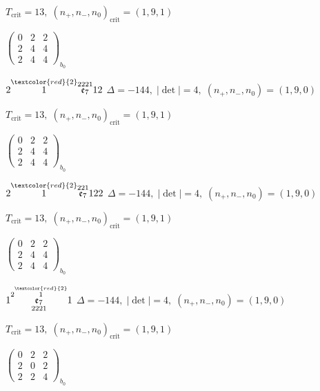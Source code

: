 \documentclass[10pt]{article}
\begin{document}
\hspace{1em}$T_{\text{crit}}=13,\; (n_+,n_-,n_0)_{\text{crit}}=(1,9,1)$

\hspace{2em}$\left(\begin{smallmatrix}0 & 2 & 2 \\ 2 & 4 & 4 \\ 2 & 4 & 4\end{smallmatrix}\right)_{\!b_0}$

\smallskip

$2\overset{\textcolor{red}{2}}{1}\overset{2221}{\mathfrak{e}_7}12$ \quad $\Delta=-144,\; |\det|=4,\; (n_+,n_-,n_0)=(1,9,0)$

\hspace{1em}$T_{\text{crit}}=13,\; (n_+,n_-,n_0)_{\text{crit}}=(1,9,1)$

\hspace{2em}$\left(\begin{smallmatrix}0 & 2 & 2 \\ 2 & 4 & 4 \\ 2 & 4 & 4\end{smallmatrix}\right)_{\!b_0}$

\smallskip

$2\overset{\textcolor{red}{2}}{1}\overset{221}{\mathfrak{e}_7}122$ \quad $\Delta=-144,\; |\det|=4,\; (n_+,n_-,n_0)=(1,9,0)$

\hspace{1em}$T_{\text{crit}}=13,\; (n_+,n_-,n_0)_{\text{crit}}=(1,9,1)$

\hspace{2em}$\left(\begin{smallmatrix}0 & 2 & 2 \\ 2 & 4 & 4 \\ 2 & 4 & 4\end{smallmatrix}\right)_{\!b_0}$

\smallskip

$1\overset{2\overset{\textcolor{red}{2}}{1}}{\underset{2221}{\mathfrak{e}_7}}1$ \quad $\Delta=-144,\; |\det|=4,\; (n_+,n_-,n_0)=(1,9,0)$

\hspace{1em}$T_{\text{crit}}=13,\; (n_+,n_-,n_0)_{\text{crit}}=(1,9,1)$

\hspace{2em}$\left(\begin{smallmatrix}0 & 2 & 2 \\ 2 & 0 & 2 \\ 2 & 2 & 4\end{smallmatrix}\right)_{\!b_0}$
\end{document}
